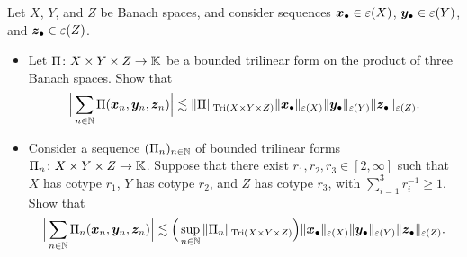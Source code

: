 \begin{exercise}\label{ex:DPLMV}
  Let $X$, $Y$, and $Z$ be Banach spaces, and consider sequences $\bm{x}_{\bullet} \in \varepsilon(X)$, $\bm{y}_{\bullet} \in \varepsilon(Y)$, and $\bm{z}_{\bullet} \in \varepsilon(Z)$.
  \begin{itemize}
  \item
    Let $\Pi \colon X \times Y \times Z \rightarrow \mathbb{K}$ be a bounded trilinear form on the product of three Banach spaces.
    Show that
    \begin{equation*}
      \Big| \sum_{n \in \mathbb{N}} \Pi(\bm{x}_{n}, \bm{y}_{n}, \bm{z}_{n}) \Big|
      \lesssim \|\Pi\|_{\mathrm{Tri}(X \times Y \times Z)} \|\bm{x}_{\bullet}\|_{\varepsilon(X)} \|\bm{y}_{\bullet}\|_{\varepsilon(Y)} \|\bm{z}_{\bullet}\|_{\varepsilon(Z)}.
    \end{equation*}
    
  \item
    Consider a sequence $(\Pi_{n})_{n \in \mathbb{N}}$ of bounded trilinear forms $\Pi_{n} \colon X \times Y \times Z \rightarrow \mathbb{K}$.
    Suppose that there exist $r_1, r_2, r_3 \in [2,\infty]$ such that $X$ has cotype $r_{1}$, $Y$ has cotype $r_{2}$, and $Z$ has cotype $r_{3}$, with $\sum_{i=1}^{3} r_{i}^{-1} \geq 1$.
    Show that
    \begin{equation*}
      \Big| \sum_{n \in \mathbb{N}} \Pi_{n}(\bm{x}_{n}, \bm{y}_{n}, \bm{z}_{n}) \Big|
      \lesssim \Big(\sup_{n \in \mathbb{N}} \|\Pi_{n}\|_{\mathrm{Tri}(X \times Y \times Z)} \Big) \|\bm{x}_{\bullet}\|_{\varepsilon(X)} \|\bm{y}_{\bullet}\|_{\varepsilon(Y)} \|\bm{z}_{\bullet}\|_{\varepsilon(Z)}.
    \end{equation*}
  \end{itemize}
\end{exercise}


